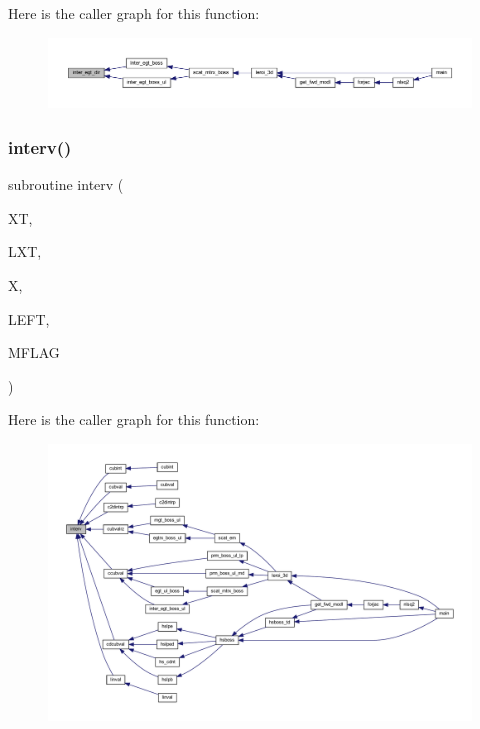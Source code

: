 Here is the caller graph for this function\+:\nopagebreak
\begin{figure}[H]
\begin{center}
\leavevmode
\includegraphics[width=350pt]{Leroi_8f90_ab648c76e3422d73a3d9c0530c4a77dd5_icgraph}
\end{center}
\end{figure}
\mbox{\label{Leroi_8f90_ab3d44a77ee1868f9a09dcac7e6bfcdce}} 
\subsubsection{\texorpdfstring{interv()}{interv()}}
{\footnotesize\ttfamily subroutine interv (\begin{DoxyParamCaption}\item[{real, dimension(lxt)}]{XT,  }\item[{integer}]{L\+XT,  }\item[{real}]{X,  }\item[{integer}]{L\+E\+FT,  }\item[{integer}]{M\+F\+L\+AG }\end{DoxyParamCaption})}

Here is the caller graph for this function\+:\nopagebreak
\begin{figure}[H]
\begin{center}
\leavevmode
\includegraphics[width=350pt]{Leroi_8f90_ab3d44a77ee1868f9a09dcac7e6bfcdce_icgraph}
\end{center}
\end{figure}
\mbox{\label{Leroi_8f90_a94be7a783132491a0e0694c462d979b5}} 
